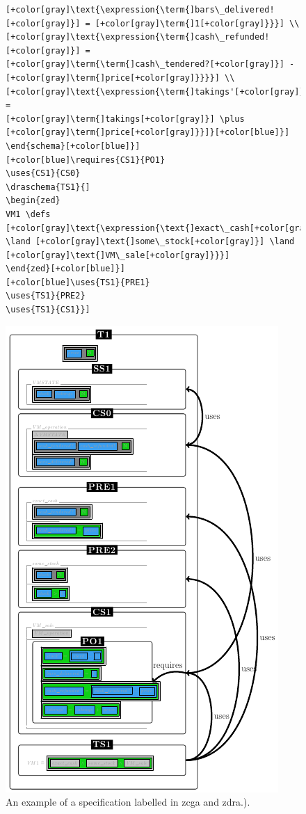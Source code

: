 \begin{figure}[H]
\begin{minipage}{0.45\textwidth}
\begin{tiny}
\begin{BVerbatim}[commandchars=+\[\]]
[+color[gray]\text{\expression{\term{]bars\_delivered![+color[gray]}] = [+color[gray]\term{]1[+color[gray]}}}] \\
[+color[gray]\text{\expression{\term{]cash\_refunded![+color[gray]}] =
[+color[gray]\term{\term{]cash\_tendered?[+color[gray]}] - [+color[gray]\term{]price[+color[gray]}}}}] \\
[+color[gray]\text{\expression{\term{]takings'[+color[gray]}] =
[+color[gray]\term{]takings[+color[gray]}] \plus [+color[gray]\term{]price[+color[gray]}}]}[+color[blue]}]
\end{schema}[+color[blue]}]
[+color[blue]\requires{CS1}{PO1}
\uses{CS1}{CS0}
\draschema{TS1}{]
\begin{zed}
VM1 \defs [+color[gray]\text{\expression{\text{]exact\_cash[+color[gray]}] 
\land [+color[gray]\text{]some\_stock[+color[gray]}] \land [+color[gray]\text{]VM\_sale[+color[gray]}}}]
\end{zed}[+color[blue]}]
[+color[blue]\uses{TS1}{PRE1}
\uses{TS1}{PRE2}
\uses{TS1}{CS1}}]
\end{BVerbatim}
\end{tiny}
\vspace{-0.18in}
\caption{An example of a specification labelled in \gls{zcga} and \gls{zdra}.).\label{fig:zdrazcgaAno}}
\vspace{-0.2in}
\end{minipage}\hfill
\begin{minipage}{0.45\textwidth}
\centering
\includegraphics[scale=0.55]{Figures/fullexample/zdra.png}

\end{minipage}
\end{figure}
